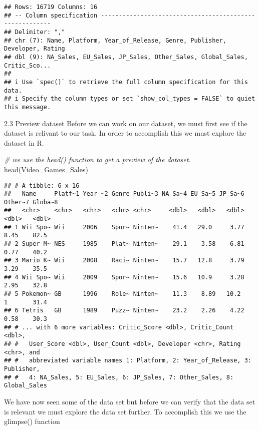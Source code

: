 \documentclass[
]{article}
\newenvironment{Shaded}{\begin{snugshade}}{\end{snugshade}}
\newcommand{\CommentTok}[1]{\textcolor[rgb]{0.56,0.35,0.01}{\textit{#1}}}
\newcommand{\FunctionTok}[1]{\textcolor[rgb]{0.00,0.00,0.00}{#1}}
\newcommand{\NormalTok}[1]{#1}
\begin{document}
\begin{verbatim}
## Rows: 16719 Columns: 16
## -- Column specification --------------------------------------------------------
## Delimiter: ","
## chr (7): Name, Platform, Year_of_Release, Genre, Publisher, Developer, Rating
## dbl (9): NA_Sales, EU_Sales, JP_Sales, Other_Sales, Global_Sales, Critic_Sco...
## 
## i Use `spec()` to retrieve the full column specification for this data.
## i Specify the column types or set `show_col_types = FALSE` to quiet this message.
\end{verbatim}

2.3 Preview dataset Before we can work on our dataset, we must first see
if the dataset is relivant to our task. In order to accomplish this we
must explore the dataset in R.

\begin{Shaded}
\begin{Highlighting}[]
\CommentTok{\# we use the head() function to get a preview of the dataset.}
\FunctionTok{head}\NormalTok{(Video\_Games\_Sales)}
\end{Highlighting}
\end{Shaded}

\begin{verbatim}
## # A tibble: 6 x 16
##   Name     Platf~1 Year_~2 Genre Publi~3 NA_Sa~4 EU_Sa~5 JP_Sa~6 Other~7 Globa~8
##   <chr>    <chr>   <chr>   <chr> <chr>     <dbl>   <dbl>   <dbl>   <dbl>   <dbl>
## 1 Wii Spo~ Wii     2006    Spor~ Ninten~    41.4   29.0     3.77    8.45    82.5
## 2 Super M~ NES     1985    Plat~ Ninten~    29.1    3.58    6.81    0.77    40.2
## 3 Mario K~ Wii     2008    Raci~ Ninten~    15.7   12.8     3.79    3.29    35.5
## 4 Wii Spo~ Wii     2009    Spor~ Ninten~    15.6   10.9     3.28    2.95    32.8
## 5 Pokemon~ GB      1996    Role~ Ninten~    11.3    8.89   10.2     1       31.4
## 6 Tetris   GB      1989    Puzz~ Ninten~    23.2    2.26    4.22    0.58    30.3
## # ... with 6 more variables: Critic_Score <dbl>, Critic_Count <dbl>,
## #   User_Score <dbl>, User_Count <dbl>, Developer <chr>, Rating <chr>, and
## #   abbreviated variable names 1: Platform, 2: Year_of_Release, 3: Publisher,
## #   4: NA_Sales, 5: EU_Sales, 6: JP_Sales, 7: Other_Sales, 8: Global_Sales
\end{verbatim}

We have now seen some of the data set but before we can verify that the
data set is relevant we must explore the data set further. To accomplish
this we use the glimpse() function
\end{document}
